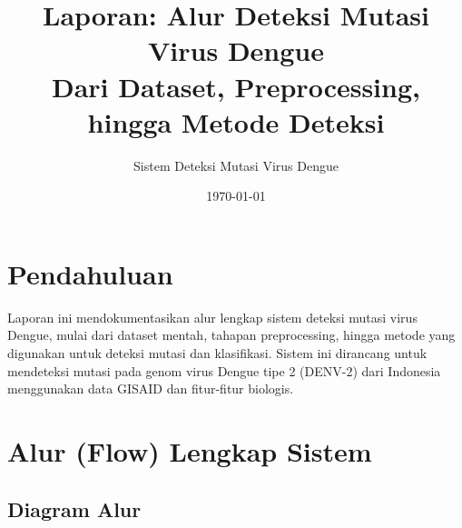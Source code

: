 \documentclass[12pt,a4paper]{article}
\title{\textbf{Laporan: Alur Deteksi Mutasi Virus Dengue}\\
\large Dari Dataset, Preprocessing, hingga Metode Deteksi}
\author{Sistem Deteksi Mutasi Virus Dengue}
\date{\today}
\begin{document}
\maketitle
\tableofcontents
\newpage

\section{Pendahuluan}

Laporan ini mendokumentasikan alur lengkap sistem deteksi mutasi virus Dengue, mulai dari dataset mentah, tahapan preprocessing, hingga metode yang digunakan untuk deteksi mutasi dan klasifikasi. Sistem ini dirancang untuk mendeteksi mutasi pada genom virus Dengue tipe 2 (DENV-2) dari Indonesia menggunakan data GISAID dan fitur-fitur biologis.

\section{Alur (Flow) Lengkap Sistem}

\subsection{Diagram Alur}
\end{document}
